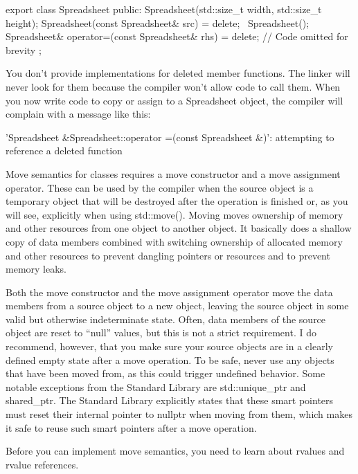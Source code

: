 \begin{cpp}
export class Spreadsheet
{
    public:
        Spreadsheet(std::size_t width, std::size_t height);
        Spreadsheet(const Spreadsheet& src) = delete;
        ~Spreadsheet();
        Spreadsheet& operator=(const Spreadsheet& rhs) = delete;
        // Code omitted for brevity
};
\end{cpp}

You don’t provide implementations for deleted member functions. The linker will never look for them because the compiler won’t allow code to call them. When you now write code to copy or assign to a Spreadsheet object, the compiler will complain with a message like this:

\begin{shell}
'Spreadsheet &Spreadsheet::operator =(const Spreadsheet &)': attempting to
reference a deleted function
\end{shell}


Move semantics for classes requires a move constructor and a move assignment operator. These can be used by the compiler when the source object is a temporary object that will be destroyed after the operation is finished or, as you will see, explicitly when using std::move(). Moving moves ownership of memory and other resources from one object to another object. It basically does a shallow copy of data members combined with switching ownership of allocated memory and other resources to prevent dangling pointers or resources and to prevent memory leaks.

Both the move constructor and the move assignment operator move the data members from a source object to a new object, leaving the source object in some valid but otherwise indeterminate state. Often, data members of the source object are reset to “null” values, but this is not a strict requirement. I do recommend, however, that you make sure your source objects are in a clearly defined empty state after a move operation. To be safe, never use any objects that have been moved from, as this could trigger undefined behavior. Some notable exceptions from the Standard Library are std::unique\_ptr and shared\_ptr. The Standard Library explicitly states that these smart pointers must reset their internal pointer to nullptr when moving from them, which makes it safe to reuse such smart pointers after a move operation.

Before you can implement move semantics, you need to learn about rvalues and rvalue references.

